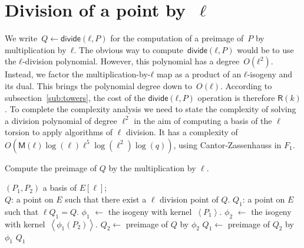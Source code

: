 \documentclass{lms}
\def\pa#1{\left(#1\right)}
\def\chev#1{\left\langle#1\right\rangle}
\def\cout#1{\mathsf{#1}}
\def\sfdiv{\mathsf{divide}}
\newcommand{\MM}{\cout{M}}
\begin{document}




\appendix
\section{Division of a point by~$\ell$}
\label{ap:division}

We write~$Q ← \sfdiv(ℓ, P)$ for the computation of a preimage of~$P$
by multiplication by~$ℓ$.
The obvious way to compute~$\sfdiv(ℓ, P)$ would be to use
the $ℓ$-division polynomial.
However, this polynomial has a degree~$O(ℓ^2)$.
Instead, we factor the multiplication-by-$ℓ$ map
as a product of an $ℓ$-isogeny and its dual.
This brings the polynomial degree down to~$O(ℓ)$.
According to subsection~\ref{sub:towers},
the cost of the $\sfdiv(ℓ, P)$ operation is therefore $\mathsf{R} (k)$.
To complete the complexity analysis we need to state the complexity of solving a division polynomial of degree $\ell^2$ in the aim of computing a basis of the $\ell$ torsion to apply algorithms of $\ell$ division. It has a complexity of $O(\MM(ℓ)\log(\ell) \ell^5 \log(\ell^2) \log(q))$, using Cantor-Zassenhauss in $F_1$.

\begin{algorithm}
\caption{\label{ldivision}Compute the preimage of $Q$ by the multiplication by $\ell$.}
\begin{algorithmic}[1]
\REQUIRE  $(P_1,P_2)$ a basis of $E[\ell]$;\\
$Q$: a point on $E$ such that there exist a $\ell$ division point of $Q$.
\ENSURE $Q_1$: a point on $E$ such that $\ell Q_1 = Q$.
\STATE $\phi_1$ $\leftarrow$ the isogeny with kernel~$\chev{P_1}$.
\STATE $\phi_2$ $\leftarrow$ the isogeny with kernel~$\chev{\phi_1(P_2)}$.
\STATE $Q_2 \leftarrow$ preimage of $Q$ by $\phi_2$
\STATE $Q_1 \leftarrow$ preimage of $Q_2$ by $\phi_1$
\RETURN $Q_1$
\end{algorithmic}
\end{algorithm}
\end{document}
